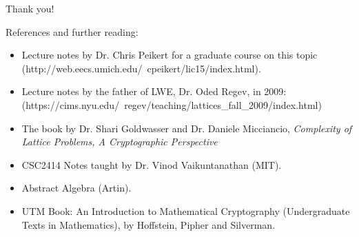 \documentclass{beamer}
\begin{document}
\begin{frame}

Thank you!

References and further reading:

\begin{itemize}
\item Lecture notes by Dr. Chris Peikert for a graduate course on this topic (http://web.eecs.umich.edu/~cpeikert/lic15/index.html).
\item Lecture notes by the father of LWE, Dr. Oded Regev, in 2009: (https://cims.nyu.edu/~regev/teaching/lattices_fall_2009/index.html)
\item The book by Dr. Shari Goldwasser and Dr. Daniele Micciancio, \textit{Complexity of Lattice Problems, A Cryptographic Perspective}
\item CSC2414 Notes taught by Dr. Vinod Vaikuntanathan (MIT).
\item Abstract Algebra (Artin).
\item UTM Book: An Introduction to Mathematical Cryptography (Undergraduate Texts in Mathematics), by Hoffstein, Pipher and Silverman.
\end{itemize}

\end{frame}
\end{document}
